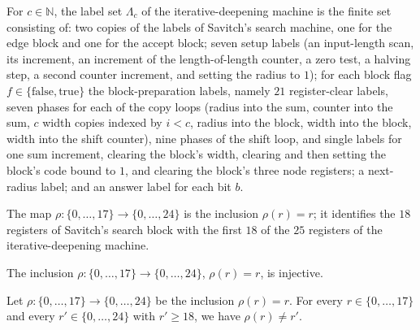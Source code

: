 \begin{definition}
\label{Complexity.LogProg.SavitchARM.DpLb}
\leanok
{}
For $c\in\mathbb{N}$, the label set $\Lambda_c$ of the iterative-deepening machine is the finite set
consisting of: two copies of the labels of Savitch's search machine, one for the edge block and one
for the accept block; seven setup labels (an input-length scan, its increment, an increment of the
length-of-length counter, a zero test, a halving step, a second counter increment, and setting the
radius to $1$); for each block flag $f\in\{\mathrm{false},\mathrm{true}\}$ the block-preparation
labels, namely $21$ register-clear labels, seven phases for each of the copy loops (radius into the
sum, counter into the sum, $c$ width copies indexed by $i<c$, radius into the block, width into the
block, width into the shift counter), nine phases of the shift loop, and single labels for one sum
increment, clearing the block's width, clearing and then setting the block's code bound to $1$, and
clearing the block's three node registers; a next-radius label; and an answer label for each bit
$b$.
\end{definition}

\begin{definition}
\label{Complexity.LogProg.SavitchARM.dpρ}
\leanok
The map $\rho:\{0,\dots,17\}\to\{0,\dots,24\}$ is the inclusion $\rho(r)=r$; it identifies the $18$
registers of Savitch's search block with the first $18$ of the $25$ registers of the
iterative-deepening machine.
\end{definition}

\begin{theorem}
\label{Complexity.LogProg.SavitchARM.dpρ_inj}
\leanok
{}
The inclusion $\rho:\{0,\dots,17\}\to\{0,\dots,24\}$, $\rho(r)=r$, is injective.
\end{theorem}

\begin{theorem}
\label{Complexity.LogProg.SavitchARM.dpρ_ne}
\leanok
{}
Let $\rho:\{0,\dots,17\}\to\{0,\dots,24\}$ be the inclusion $\rho(r)=r$. For every
$r\in\{0,\dots,17\}$ and every $r'\in\{0,\dots,24\}$ with $r'\ge 18$, we have $\rho(r)\ne r'$.
\end{theorem}

